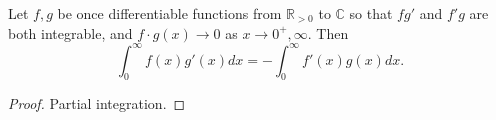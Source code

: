 \begin{lemma}[PartialIntegration]
\label{PartialIntegration}
\leanok
Let $f, g$ be once differentiable functions from $\mathbb{R}_{>0}$ to $\mathbb{C}$ so that $fg'$
  and $f'g$ are both integrable, and $f\cdot g (x)\to 0$ as $x\to 0^+,\infty$.
  Then
  $$
  \int_0^\infty f(x)g'(x) dx = -\int_0^\infty f'(x)g(x)dx.
  $$
\end{lemma}
\begin{proof}
\leanok
Partial integration.
\end{proof}
